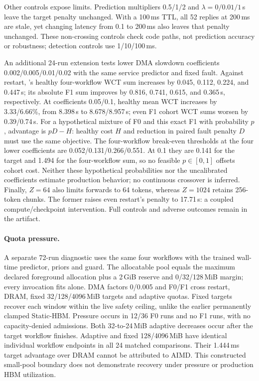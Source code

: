 Other controls expose limits. Prediction multipliers 0.5/1/2 and
$\lambda=0/0.01/1$\,s leave the target penalty unchanged. With a 100\,ms TTL,
all 52 replies at 200\,ms are stale, yet changing latency from 0.1 to 200\,ms
also leaves that penalty unchanged. These non-crossing controls check code
paths, not prediction accuracy or robustness; detection controls use 1/10/100\,ms.

An additional 24-run extension tests lower DMA slowdown coefficients
0.002/0.005/0.01/0.02 with the same service predictor and fixed fault.
Against restart, \system's healthy four-workflow WCT sum increases by
0.045, 0.112, 0.224, and 0.447\,s; its absolute F1 sum improves by
0.816, 0.741, 0.615, and 0.365\,s, respectively. At coefficients 0.05/0.1, healthy mean WCT
increases by 3.33/6.66\%, from 8.398\,s to 8.678/8.957\,s;
even F1 cohort WCT sums worsen by 0.39/0.74\,s.
For a hypothetical mixture of F0 and this exact
F1 with probability $p$, advantage is $pD-H$: healthy cost $H$ and reduction
in paired fault penalty $D$ must use the same objective. The four-workflow
break-even thresholds at the four lower coefficients are
0.052/0.131/0.266/0.551. At 0.1 they are 0.141 for the target and 1.494
for the four-workflow sum, so no feasible $p\in[0,1]$ offsets cohort cost.
Neither these hypothetical probabilities nor the uncalibrated coefficients
estimate production behavior; no continuous crossover is inferred.
Finally, $Z=64$ also limits forwards to 64 tokens, whereas $Z=1024$ retains
256-token chunks. The former raises even restart's penalty to 17.71\,s:
a coupled compute/checkpoint intervention. Full controls and adverse outcomes
remain in the artifact.

\paragraph{Quota pressure.}
A separate 72-run diagnostic uses the same four workflows with the trained
wall-time predictor, priors and guard. The allocatable pool equals the maximum
declared foreground allocation plus a 2\,GiB reserve and 0/32/128\,MiB margin;
every invocation fits alone. DMA factors 0/0.005 and F0/F1 cross restart,
DRAM, fixed 32/128/4096\,MiB targets and adaptive quotas. Fixed targets recover
each window within the live safety ceiling, unlike the earlier permanently
clamped Static-HBM. Pressure occurs in 12/36 F0 runs and no F1 runs, with no
capacity-denied admissions. Both 32-to-24\,MiB adaptive decreases occur after
the target workflow finishes. Adaptive and fixed 128/4096\,MiB have identical
individual workflow endpoints in all 24 matched comparisons. Their 1.444\,ms
target advantage over DRAM cannot be attributed to AIMD. This constructed
small-pool boundary does not demonstrate recovery under pressure or production
HBM utilization.

